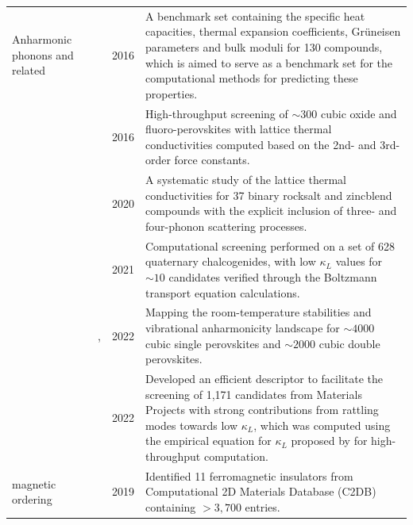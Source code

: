 \begin{longtable}{p{2cm}p{3cm}p{0.9cm}p{11cm}}
\footnotesize{Anharmonic phonons and related}
& \footnotesize{\citet{nath2016high}}
& \footnotesize{2016}
& \footnotesize{A benchmark set containing the specific heat capacities, thermal expansion coefficients, Gr\"{u}neisen parameters and bulk moduli for 130 compounds, which is aimed to serve as a benchmark set for the computational methods for predicting these properties.}\\

&\footnotesize{\citet{van2016high}}
&\footnotesize{2016}
&\footnotesize{High-throughput screening of $\sim 300$ cubic oxide and fluoro-perovskites with lattice thermal conductivities computed based on the 2nd- and 3rd-order force constants.}\\

& \footnotesize{\citet{xia2020high}}
& \footnotesize{2020}
& \footnotesize{A systematic study of the lattice thermal conductivities for 37 binary rocksalt and zincblend compounds with the explicit inclusion of three- and four-phonon scattering processes.}\\

& \footnotesize{\citet{pal2021accelerated}}
& \footnotesize{2021}
& \footnotesize{Computational screening performed on a set of 628 quaternary chalcogenides, with low $\kappa_L$ values for  $\sim10$ candidates verified through the Boltzmann transport equation calculations.}\\

& \footnotesize{\citet{yang2021altas}, \citet{yang2022mapping}}
& \footnotesize{2022}
& \footnotesize{Mapping the room-temperature stabilities and vibrational anharmonicity landscape for $\sim 4000$ cubic single perovskites and $\sim 2000$ cubic double perovskites.}\\

& \footnotesize{\citet{li2022high}}
& \footnotesize{2022}
& \footnotesize{Developed an efficient descriptor to facilitate the screening of 1,171 candidates from Materials Projects with strong contributions from rattling modes towards low $\kappa_L$, which was computed using the empirical equation for $\kappa_L$ proposed by \citet{yan2015material} for high-throughput computation.}\\



\footnotesize{magnetic ordering}
&\footnotesize{\citet{torelli2019high}}
&\footnotesize{2019}
&\footnotesize{Identified 11 ferromagnetic insulators from Computational 2D Materials Database (C2DB)\cite{Haastrup_2018,Gjerding_2021} containing $>3,700$ entries.}\\


\end{longtable}
